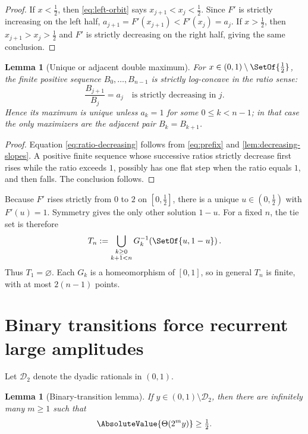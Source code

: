 \documentclass[11pt,oneside]{article}
\newtheorem{lemma}[theorem]{Lemma}
\theoremstyle{definition}
\theoremstyle{remark}
\newcommand{\D}{\mathcal D}
\newcommand{\ThetaF}{\Theta}
\newcommand{\half}{\tfrac12}
\begin{document}
\begin{proof}
If $x<\half$, then \eqref{eq:left-orbit} says $x_{j+1}<x_j<\half$.  Since $F'$ is
strictly increasing on the left half, $a_{j+1}=F'(x_{j+1})<F'(x_j)=a_j$.
If $x>\half$, then $x_{j+1}>x_j>\half$ and $F'$ is strictly decreasing on the right
half, giving the same conclusion.
\end{proof}

\begin{lemma}[Unique or adjacent double maximum]
\label{lem:prefix-unimodal}
For $x\in(0,1)\setminus\SetOf{\half}$, the finite positive sequence
$B_0,\ldots,B_{n-1}$ is strictly log-concave in the ratio sense:
\begin{equation}
 \frac{B_{j+1}}{B_j}=a_j
 \quad\text{is strictly decreasing in }j.
 \label{eq:ratio-decreasing}
\end{equation}
Hence its maximum is unique unless $a_k=1$ for some $0\leq k<n-1$; in that case the
only maximizers are the adjacent pair $B_k=B_{k+1}$.
\end{lemma}

\begin{proof}
Equation \eqref{eq:ratio-decreasing} follows from \eqref{eq:prefix} and
\cref{lem:decreasing-slopes}.  A positive finite sequence whose successive ratios
strictly decrease first rises while the ratio exceeds $1$, possibly has one flat step
when the ratio equals $1$, and then falls.  The conclusion follows.
\end{proof}

Because $F'$ rises strictly from $0$ to $2$ on $[0,\half]$, there is a unique
$u\in(0,\half)$ with $F'(u)=1$.  Symmetry gives the only other solution $1-u$.
For a fixed $n$, the tie set is therefore
\begin{equation}
 T_n:=\bigcup_{\substack{k\geq0\\k+1<n}}
 G_k^{-1}\!\left(\SetOf{u,1-u}\right).
 \label{eq:tie-set}
\end{equation}
Thus $T_1=\varnothing$.  Each $G_k$ is a homeomorphism of $[0,1]$, so in
general $T_n$ is finite, with at most $2(n-1)$ points.

\section{Binary transitions force recurrent large amplitudes}
\label{sec:binary}

Let $\D_2$ denote the dyadic rationals in $(0,1)$.

\begin{lemma}[Binary-transition lemma]
\label{lem:binary-transition}
If $y\in(0,1)\setminus\D_2$, then there are infinitely many $m\geq1$ such that
\begin{equation}
 \AbsoluteValue{\ThetaF(2^m y)}\geq\half.
 \label{eq:theta-recurrence}
\end{equation}
\end{lemma}
\end{document}
